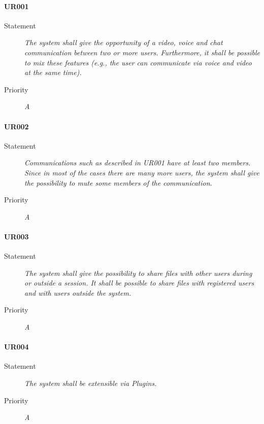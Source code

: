 \paragraph{UR001}
\begin{description}
\item [Statement] \textit{The system shall give the opportunity of a video,
    voice and chat communication between two or more users. Furthermore, it
    shall be possible to mix these features (e.g., the user can communicate
    via voice and video at the same time).}
\item [Priority] \textit{A}
\end{description}

\paragraph{UR002}
\begin{description}
\item[Statement] \textit{Communications such as described in UR001 have at
    least two members. Since in most of the cases there are many more users,
    the system shall give the possibility to mute some members of the
    communication.}
\item[Priority] \textit{A}
\end{description}

\paragraph{UR003}
\begin{description}
\item[Statement] \textit{The system shall give the possibility to share files
    with other users during or outside a session. It shall be possible to
    share files with registered users and with users outside the system.}
\item[Priority] \textit{A}
\end{description}

\paragraph{UR004}
\begin{description}
\item[Statement] \textit{The system shall be extensible via \gls{Plugins}.}
\item[Priority] \textit{A}
\end{description}

